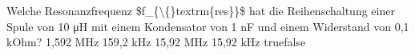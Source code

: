     {Welche Resonanzfrequenz \$f\_\{\textbackslash\{\}textrm\{res\}\}\$ hat die Reihenschaltung einer Spule von 10 μH mit einem Kondensator von 1 nF und einem Widerstand von 0,1 kOhm?}
    {1,592 MHz}
    {159,2 kHz}
    {15,92 MHz}
    {15,92 kHz}
    {true}{false}